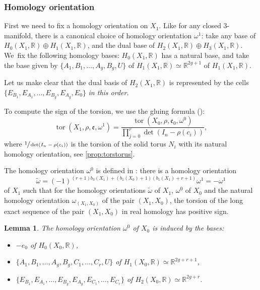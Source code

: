 \documentclass[JEP,XML,SOM,Unicode,NoFloatCountersInSection,published]{cedram}
\theoremstyle{plain}
\newtheorem{lem}[thm]{Lemma}
\theoremstyle{definition}
\theoremstyle{remark}
\newcommand{\R}{\mathbb{R}}
\numberwithin{equation}{section}
\DeclareMathOperator{\tor}{tor}
\begin{document}
\label{subsubsec:sign}

\subsubsection*{Homology orientation}
First we need to fix a homology orientation on $X_1$. Like for any closed 3\nobreakdash-manifold, there is a canonical choice of homology orientation $\omega^1$: take any base of $H_0(X_1, \R) \oplus H_1(X_1, \R)$, and the dual base of $H_2(X_1, \R) \oplus H_3(X_1, \R)$.
We~fix the following homology bases:
$H_0(X_1, \R)$ has a natural base, and take the base given by $\{A_1, B_1, \ldots, A_g, B_g, U\}$ of $H_1(X_1, \R) \simeq \R^{2g+1}$ of $H_1(X_1, \R)$.

Let us make clear that the dual basis of $H_2(X_1, \R)$ is represented by the cells
$\{ E_{B_1}, E_{A_1}, \ldots, E_{B_g}, E_{A_g}, E_0\}$ \emph{in this order}.

To compute the sign of the torsion, we use the gluing formula (\cite[Th.\,VII.1.4]{Turaev_tors}):
\begin{equation}
\label{eq:TurGlue}
\tor(X_1, \rho, \mathfrak e, \omega^1) = \frac { \tor (X_0, \rho, \mathfrak e_0, \omega^0)}{\prod_{j=0}^r \det(I_n-\rho(c_i))},
\end{equation}
where $\sfrac 1 {\det(I_n-\rho(c_i))}$ is the torsion of the solid torus $N_i$ with its natural homology orientation, see \cref{prop:torstorus}.

The homology orientation $\omega^0$ is defined in \cite[\S V.2]{Turaev_tors}: there is a homology orientation
\[
\widetilde \omega = (-1)^{(r+1)b_3(X_1) + (b_1(X_0)+1)(b_1(X_1)+r+1)} \omega^1 = - \omega^1
\]
of $X_1$
such that for the homology orientations $\widetilde \omega$ of $X_1$, $\omega^0$ of $X_0$ and the natural homology orientation $\omega_{(X_1, X_0)}$ of the pair $(X_1, X_0)$, the torsion of the long exact sequence of the pair $(X_1,X_0)$ in real homology has positive sign.

\begin{lem}
The homology orientation $\omega^0$ of $X_0$ is induced by the bases:
\begin{itemize}
\item
$-e_0$ of $H_0(X_0, \R)$,
\item
$\{A_1, B_1, \ldots, A_g, B_g, C_1, \ldots, C_r, U \}$ of $H_1(X_0, \R) \simeq \R^{2g+r+1}$,
\item
$\{ E_{B_1}, E_{A_1}, \ldots, E_{B_g}, E_{A_g}, E_{C_1}, \ldots, E_{C_r}\}$ of $H_2(X_0, \R) \simeq \R^{2g+r}$.
\end{itemize}
\end{lem}
\end{document}
